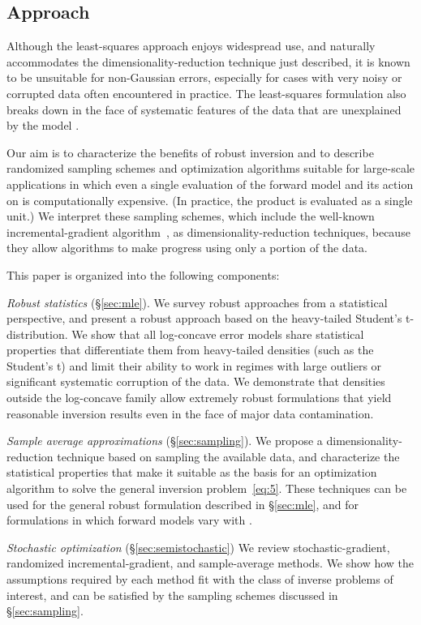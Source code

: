\documentclass[nospthms]{svjour3}
\numberwithin{equation}{section}
\begin{document}
\subsection{Approach}

Although the least-squares approach enjoys widespread use, and
naturally accommodates the dimensionality-reduction technique just
described, it is known to be unsuitable for non-Gaussian errors,
especially for cases with very noisy or corrupted data often encountered in practice.
The least-squares formulation also breaks down in the face of systematic features of the data that
are unexplained by the model .

Our aim is to characterize the benefits of robust inversion and to
describe randomized sampling schemes and optimization algorithms
suitable for large-scale applications in which even a single evaluation
of the forward model and its action on  is computationally
expensive. (In practice, the product  is evaluated as a
single unit.) We interpret these sampling schemes, which include
the well-known incremental-gradient
algorithm~\cite{nedic2000convergence}, as dimensionality-reduction
techniques, because they allow algorithms to make progress using only
a portion of the data.

This paper is organized into the following components:

{\it Robust statistics} (\S\ref{sec:mle}). We survey robust approaches
from a statistical perspective, and present a robust approach based on
the heavy-tailed Student's t-distribution.  We show that all
log-concave error models share statistical properties that
differentiate them from heavy-tailed densities (such as the Student's
t) and limit their ability to work in regimes with large outliers or
significant systematic corruption of the data.  We demonstrate that
densities outside the log-concave family allow extremely robust
formulations that yield reasonable inversion results even in the face
of major data contamination.

{\it Sample average approximations} (\S\ref{sec:sampling}). We propose
a dimensionality-reduction technique based on sampling the available
data, and characterize the statistical properties that make it
suitable as the basis for an optimization algorithm to solve the
general inversion problem~\eqref{eq:5}. These techniques can be used
for the general robust formulation described in \S\ref{sec:mle}, and
for formulations in which forward models  vary with .

{\it Stochastic optimization} (\S\ref{sec:semistochastic}) We review
stochastic-gradient, randomized in\-cremental-gradient, and
sample-average methods. We show how the assumptions required by each
method fit with the class of inverse problems of interest, and can be
satisfied by the sampling schemes discussed in \S\ref{sec:sampling}.
\end{document}
